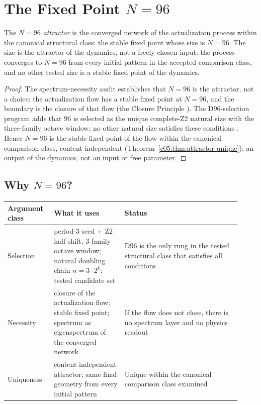 \section{The Fixed Point \texorpdfstring{$N=96$}{N=96}}
\label{c05:sec:n96}

\begin{theorem}[The attractor is \texorpdfstring{$N=96$}{N=96}, not a choice; no freedom in the size]
\label{c05:thm:n96-attractor}
The \emph{$N=96$ attractor} is the converged network of the actualization process within the
canonical structural class: the stable fixed point whose size is $N=96$. The size is the
attractor of the dynamics, not a freely chosen input: the process converges to $N=96$ from
every initial pattern in the accepted comparison class, and no other tested size is a stable
fixed point of the dynamics.
\end{theorem}

\begin{proof}
The spectrum-necessity audit \cite{c05:QG295} establishes that $N=96$ is the attractor, not a
choice: the actualization flow has a stable fixed point at $N=96$, and the boundary is the
closure of that flow (the Closure Principle \cite{c05:QG282}). The D96-selection program adds
that $96$ is selected as the unique complete-Z2 natural size with the three-family octave
window; no other natural size satisfies these conditions \cite{c05:QG159,c05:QG160}. Hence
$N=96$ is the stable fixed point of the flow within the canonical comparison class,
content-independent (Theorem~\ref{c05:thm:attractor-unique}): an output of the dynamics, not
an input or free parameter.
\end{proof}

\subsection{Why \texorpdfstring{$N=96$}{N=96}?}
\label{c05:sec:why-n96}

\begin{table}[h]
\centering
\begin{tabular}{p{0.18\linewidth}p{0.28\linewidth}p{0.46\linewidth}}
\hline
\textbf{Argument class} & \textbf{What it uses} & \textbf{Status} \\
\hline
Selection & period-3 seed + Z2 half-shift; 3-family octave window; natural doubling chain $n=3\cdot2^k$; tested candidate set \cite{c05:QG159,c05:QG160} & D96 is the only rung in the tested structural class that satisfies all conditions \\
Necessity & closure of the actualization flow; stable fixed point; spectrum as eigenspectrum of the converged network \cite{c05:QG282,c05:QG295} & If the flow does not close, there is no spectrum layer and no physics readout \\
Uniqueness & content-independent attractor; same final geometry from every initial pattern \cite{c05:QG116} & Unique within the canonical comparison class examined \\
\hline
\end{tabular}
\end{table}

